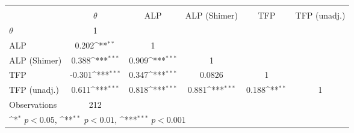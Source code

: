 {
\def\sym#1{\ifmmode^{#1}\else\(^{#1}\)\fi}
\begin{tabular}{l*{5}{c}}
\toprule
                &\multicolumn{5}{c}{}                                                                          \\
                & $\theta$         &      ALP         &ALP (Shimer)         &      TFP         &TFP (unadj.)         \\
\midrule
$\theta$        &        1         &                  &                  &                  &                  \\
ALP             &    0.202\sym{**} &        1         &                  &                  &                  \\
ALP (Shimer)    &    0.388\sym{***}&    0.909\sym{***}&        1         &                  &                  \\
TFP             &   -0.301\sym{***}&    0.347\sym{***}&   0.0826         &        1         &                  \\
TFP (unadj.)    &    0.611\sym{***}&    0.818\sym{***}&    0.881\sym{***}&    0.188\sym{**} &        1         \\
\midrule
Observations    &      212         &                  &                  &                  &                  \\
\bottomrule
\multicolumn{6}{l}{\footnotesize \sym{*} \(p<0.05\), \sym{**} \(p<0.01\), \sym{***} \(p<0.001\)}\\
\end{tabular}
}
